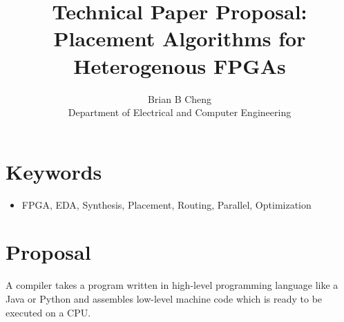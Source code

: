 \documentclass{article}
\begin{document}
\title{Technical Paper Proposal: \\ Placement Algorithms for Heterogenous FPGAs}
\author{Brian B Cheng \\ Department of Electrical and Computer Engineering}


\date{}
\maketitle

\section{Keywords}
\begin{itemize}
    \item FPGA, EDA, Synthesis, Placement, Routing, Parallel, Optimization
\end{itemize}


\section{Proposal}
    A compiler takes a program written in high-level programming language like a Java or Python and assembles low-level machine code which is ready to be executed on a CPU.
\end{document}
